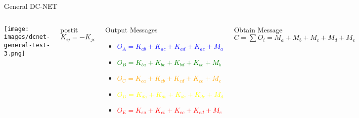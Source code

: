 \begin{frame}{General DC-NET}

\begin{columns}[c]
    \centering
    \texttt{[image: images/dcnet-general-test-3.png]}
    \vspace{.5cm}
    \begin{beamercolorbox}[sep=1em,wd=3cm,center]{postit}
        $K_{ij} = -K_{ji}$
    \end{beamercolorbox}
    \centering
    \begin{block}{Output Messages}
      \footnotesize
      \begin{itemize}
      \setlength{\itemindent}{-.25in}
          \item[] \textcolor{blue}{$O_A = K_{ab} + K_{ac} + K_{ad} + K_{ae} + M_a$}
          \item[] \textcolor{green}{$O_B = K_{ba} + K_{bc} + K_{bd} + K_{be} + M_b$}
          \item[] \textcolor{orange}{$O_C = K_{ca} + K_{cb} + K_{cd} + K_{ce} + M_c$}
          \item[] \textcolor{yellow}{$O_D = K_{da} + K_{db} + K_{dc} + K_{de} + M_d$}
          \item[] \textcolor{red}{$O_E = K_{ea} + K_{eb} + K_{ec} + K_{ed} + M_e$}
      \end{itemize}
    \end{block}
    
    \begin{exampleblock}{Obtain Message}
    \centering
    $C = \sum O_i = M_a + M_b + M_c + M_d + M_e$
    \end{exampleblock}
\end{columns}

\end{frame}